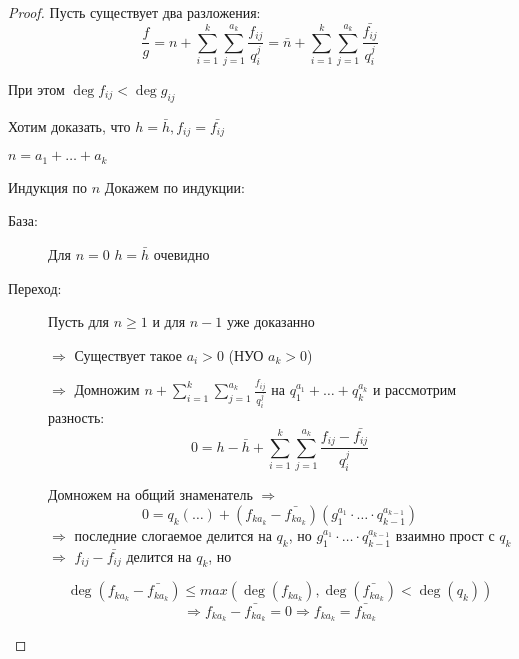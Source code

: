 \begin{proof}
Пусть существует два разложения:
$$\frac{f}{g} = n + \sum_{i=1}^k\sum_{j=1}^{a_k} \frac{f_{ij}}{q_i^j}
 = \bar{n} + \sum_{i=1}^k\sum_{j=1}^{a_k} \frac{\bar{f_{ij}}}{q_i^j}$$

При этом $\deg f_{ij} < \deg g_{ij}$

Хотим доказать, что $h = \bar{h}, f_{ij} = \bar{f_{ij}}$

$n = a_1 + \dots + a_k$

Индукция по $n$
Докажем по индукции:
\begin{description}
\item[База:] Для $n = 0$ $h = \bar{h}$
очевидно
\item[Переход:] Пусть для $n \ge 1$ и для $n - 1$ уже доказанно

$\Rightarrow$ Существует такое $a_i > 0$ (НУО $a_k > 0$)

$\Rightarrow$ Домножим $n + \sum_{i=1}^k\sum_{j=1}^{a_k} \frac{f_{ij}}{q_i^j}$ на
$q_1^{a_1} + \dots + q_k^{a_k}$ и рассмотрим разность:
$$0 = h - \bar{h} + \sum_{i=1}^k\sum_{j=1}^{a_k} \frac{f_{ij} - \bar{f_{ij}}}{q_i^j}$$

Домножем на общий знаменатель $\Rightarrow$
$$0 = q_k (\dots) + (f_{ka_k} - \bar{f_{ka_k}})(g_1^{a_1}\cdot\dots\cdot q_{k-1}^{a_{k-1}})$$
$\Rightarrow$ последние слогаемое делится на $q_k$, но $g_1^{a_1}\cdot\dots\cdot q_{k-1}^{a_{k-1}}$
взаимно прост с $q_k$ $\Rightarrow$ $f_{ij} - \bar{f_{ij}}$ делится на $q_k$, но

$$\deg(f_{ka_k} - \bar{f_{ka_k}}) \le max(\deg(f_{ka_k}), \deg(\bar{f_{ka_k}}) < \deg(q_k))$$
$$\Rightarrow f_{ka_k} - \bar{f_{ka_k}} = 0 \Rightarrow f_{ka_k} = \bar{f_{ka_k}}$$
\end{description}
\end{proof}  
